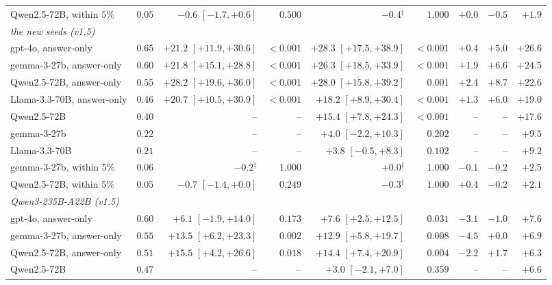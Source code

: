 \documentclass{article}
\begin{document}
\begin{table}[htbp]
{\begin{tabular}{lrrrrrrrr}
Qwen2.5-72B, within $5\%$ & $0.05$ & $-0.6$ {\scriptsize$[-1.7,+0.6]$} & $0.500$ & $-0.4$$^{\ddagger}$ & $1.000$ & $+0.0$ & $-0.5$ & $+1.9$\\
\multicolumn{9}{l}{\emph{the new seeds (v1.5)}}\\
gpt-4o, answer-only & $0.65$ & $+21.2$ {\scriptsize$[+11.9,+30.6]$} & $<0.001$ & $+28.3$ {\scriptsize$[+17.5,+38.9]$} & $<0.001$ & $+0.4$ & $+5.0$ & $+26.6$\\
gemma-3-27b, answer-only & $0.60$ & $+21.8$ {\scriptsize$[+15.1,+28.8]$} & $<0.001$ & $+26.3$ {\scriptsize$[+18.5,+33.9]$} & $<0.001$ & $+1.9$ & $+6.6$ & $+24.5$\\
Qwen2.5-72B, answer-only & $0.55$ & $+28.2$ {\scriptsize$[+19.6,+36.0]$} & $<0.001$ & $+28.0$ {\scriptsize$[+15.8,+39.2]$} & $0.001$ & $+2.4$ & $+8.7$ & $+22.6$\\
Llama-3.3-70B, answer-only & $0.46$ & $+20.7$ {\scriptsize$[+10.5,+30.9]$} & $<0.001$ & $+18.2$ {\scriptsize$[+8.9,+30.4]$} & $<0.001$ & $+1.3$ & $+6.0$ & $+19.0$\\
Qwen2.5-72B & $0.40$ & -- & -- & $+15.4$ {\scriptsize$[+7.8,+24.3]$} & $<0.001$ & -- & -- & $+17.6$\\
gemma-3-27b & $0.22$ & -- & -- & $+4.0$ {\scriptsize$[-2.2,+10.3]$} & $0.202$ & -- & -- & $+9.5$\\
Llama-3.3-70B & $0.21$ & -- & -- & $+3.8$ {\scriptsize$[-0.5,+8.3]$} & $0.102$ & -- & -- & $+9.2$\\
gemma-3-27b, within $5\%$ & $0.06$ & $-0.2$$^{\ddagger}$ & $1.000$ & $+0.0$$^{\ddagger}$ & $1.000$ & $-0.1$ & $-0.2$ & $+2.5$\\
Qwen2.5-72B, within $5\%$ & $0.05$ & $-0.7$ {\scriptsize$[-1.4,+0.0]$} & $0.249$ & $-0.3$$^{\ddagger}$ & $1.000$ & $+0.4$ & $-0.2$ & $+2.1$\\
\multicolumn{9}{l}{\emph{Qwen3-235B-A22B (v1.5)}}\\
gpt-4o, answer-only & $0.60$ & $+6.1$ {\scriptsize$[-1.9,+14.0]$} & $0.173$ & $+7.6$ {\scriptsize$[+2.5,+12.5]$} & $0.031$ & $-3.1$ & $-1.0$ & $+7.6$\\
gemma-3-27b, answer-only & $0.55$ & $+13.5$ {\scriptsize$[+6.2,+23.3]$} & $0.002$ & $+12.9$ {\scriptsize$[+5.8,+19.7]$} & $0.008$ & $-4.5$ & $+0.0$ & $+6.9$\\
Qwen2.5-72B, answer-only & $0.51$ & $+15.5$ {\scriptsize$[+4.2,+26.6]$} & $0.018$ & $+14.4$ {\scriptsize$[+7.4,+20.9]$} & $0.004$ & $-2.2$ & $+1.7$ & $+6.3$\\
Qwen2.5-72B & $0.47$ & -- & -- & $+3.0$ {\scriptsize$[-2.1,+7.0]$} & $0.359$ & -- & -- & $+6.6$\\

\end{tabular}}
\end{table}
\end{document}
